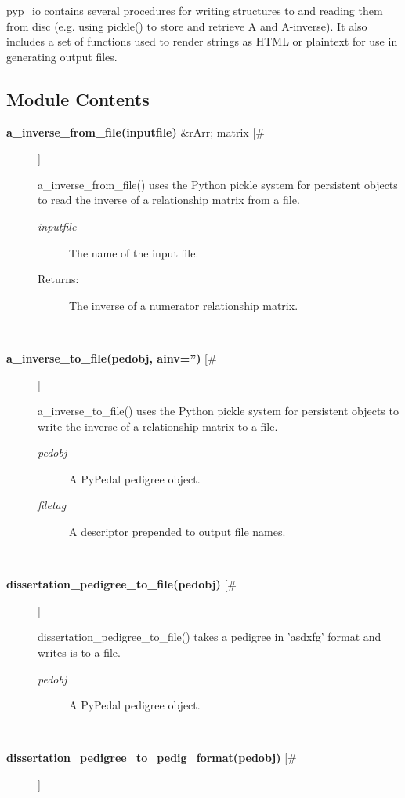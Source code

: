 

 pyp\_io contains several procedures for writing structures to and reading them from disc (e.g. using pickle() to store and retrieve A and A-inverse). It also includes a set of functions used to render strings as HTML or plaintext for use in generating output files.
\subsection*{Module Contents}
\begin{description}
\item[\textbf{a\_inverse\_from\_file(inputfile)}
 \&rArr; matrix [\#]]

 a\_inverse\_from\_file() uses the Python pickle system for persistent objects to read the inverse of a relationship matrix from a file.
\begin{description}
\item[\emph{inputfile}
] The name of the input file.
\item[Returns:] The inverse of a numerator relationship matrix.

\end{description}
\\ 

\item[\textbf{a\_inverse\_to\_file(pedobj, ainv='')}
 [\#]]

 a\_inverse\_to\_file() uses the Python pickle system for persistent objects to write the inverse of a relationship matrix to a file.
\begin{description}
\item[\emph{pedobj}
] A PyPedal pedigree object.
\item[\emph{filetag}
] A descriptor prepended to output file names.

\end{description}
\\ 

\item[\textbf{dissertation\_pedigree\_to\_file(pedobj)}
 [\#]]

 dissertation\_pedigree\_to\_file() takes a pedigree in 'asdxfg' format and writes is to a file.
\begin{description}
\item[\emph{pedobj}
] A PyPedal pedigree object.

\end{description}
\\ 

\item[\textbf{dissertation\_pedigree\_to\_pedig\_format(pedobj)}
 [\#]]


\end{description}
